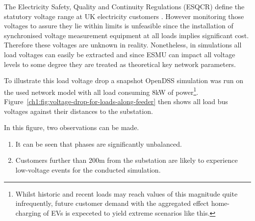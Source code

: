 The Electricity Safety, Quality and Continuity Regulations (ESQCR) define the statutory voltage range at UK electricity customers \cite{HealthandSafetyExecutive2002}.
However monitoring those voltages to assure they lie within limits is unfeasible since the installation of synchronised voltage measurement equipment at all loads implies significant cost.
Therefore these voltages are unknown in reality.
Nonetheless, in simulations all load voltages can easily be extracted and since ESMU can impact all voltage levels to some degree they are treated as theoretical key network parameters.

To illustrate this load voltage drop a snapshot OpenDSS simulation was run on the used network model with all load consuming  8kW of power\footnote{Whilst historic and recent loads may reach values of this magnitude quite infrequently, future customer demand with the aggregated effect home-charging of EVs is expeceted to yield extreme scenarios like this.}.
Figure~\ref{ch1:fig:voltage-drop-for-loads-along-feeder} then shows all load bus voltages against their distances to the substation.




In this figure, two observations can be made.

\begin{enumerate}
	\item It can be seen that phases are significantly unbalanced. 
	\item Customers further than 200m from the substation are likely to experience low-voltage events for the conducted simulation.
\end{enumerate}

